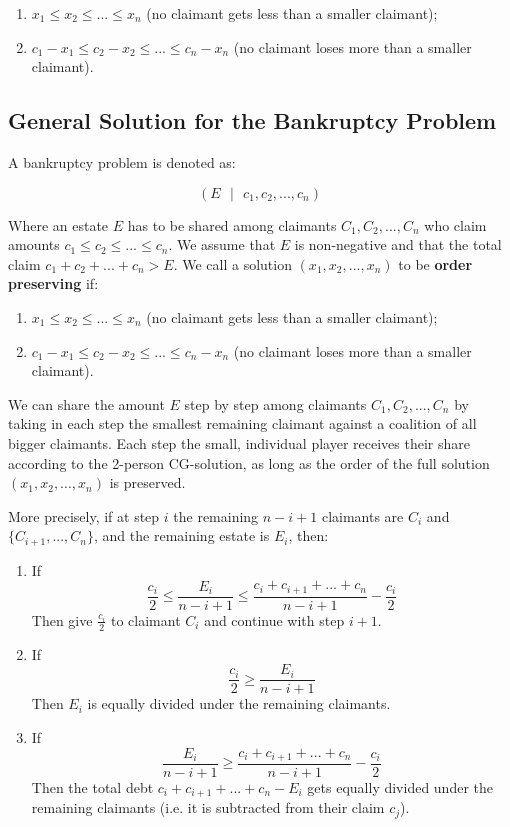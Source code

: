 \documentclass[12pt]{article}
\begin{document}
\begin{enumerate}
    \item $x_1 \leq x_2 \leq ... \leq x_n$ (no claimant gets less than a smaller claimant);
    \item $c_1 - x_1 \leq c_2 - x_2 \leq ... \leq c_n - x_n$ (no claimant loses more than a smaller claimant).
\end{enumerate}

\subsection{General Solution for the Bankruptcy Problem}
A bankruptcy problem is denoted as:

\[ (E \text{ } | \text{ } c_1, c_2, ... , c_n) \]

\noindent
Where an estate $E$ has to be shared among claimants $C_1, C_2, ... , C_n$ who claim amounts $c_1 \leq c_2 \leq ... \leq c_n$.
We assume that $E$ is non-negative and that the total claim $c_1 + c_2 + ... + c_n > E$.
We call a solution $(x_1, x_2, ... , x_n)$ to be \textbf{order preserving} if:

\begin{enumerate}
    \item $x_1 \leq x_2 \leq ... \leq x_n$ (no claimant gets less than a smaller claimant);
    \item $c_1 - x_1 \leq c_2 - x_2 \leq ... \leq c_n - x_n$ (no claimant loses more than a smaller claimant).
\end{enumerate}

\noindent
We can share the amount $E$ step by step among claimants $C_1, C_2, ... , C_n$ by taking in each step the smallest remaining claimant against a coalition of all bigger claimants.
Each step the small, individual player receives their share according to the 2-person CG-solution, as long as the order of the full solution $(x_1, x_2, ... , x_n)$ is preserved.

\newpage
\noindent
More precisely, if at step $i$ the remaining $n - i + 1$ claimants are $C_i$ and $\{C_{i + 1}, ... , C_n\}$, and the remaining estate is $E_i$, then:

\begin{enumerate}
    \item If
    \[ \frac{c_i}{2} \leq \frac{E_i}{n - i + 1} \leq \frac{c_i + c_{i + 1} + ... + c_n}{n - i + 1} - \frac{c_i}{2} \]
    Then give $\frac{c_i}{2}$ to claimant $C_i$ and continue with step $i + 1$.
    \item If
    \[ \frac{c_i}{2} \geq \frac{E_i}{n - i + 1} \]
    Then $E_i$ is equally divided under the remaining claimants.
    \item If
    \[ \frac{E_i}{n - i + 1} \geq \frac{c_i + c_{i + 1} + ... + c_n}{n - i + 1} - \frac{c_i}{2} \]
    Then the total debt $c_i + c_{i + 1} + ... + c_n - E_i$ gets equally divided under the remaining claimants (i.e. it is subtracted from their claim $c_j$).
\end{enumerate}
\end{document}
